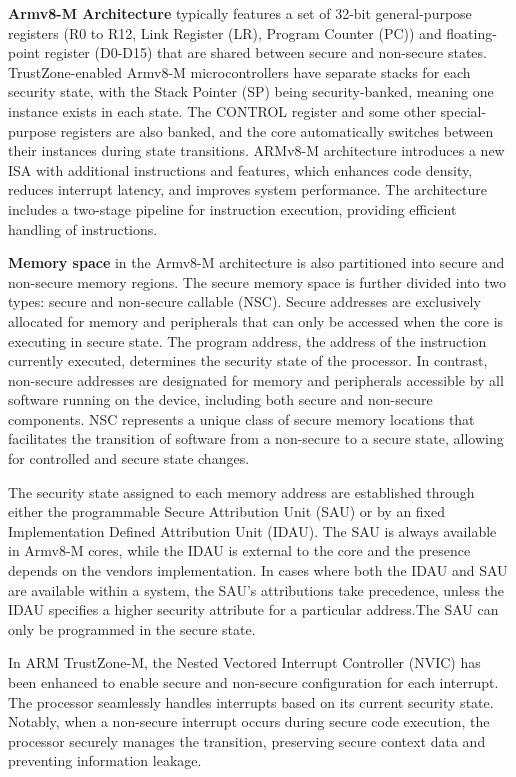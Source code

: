 \textbf{Armv8-M Architecture} typically features a set of 32-bit general-purpose registers (R0 to R12, Link Register (LR), Program Counter (PC)) and floating-point register (D0-D15) that are shared between secure and non-secure states. TrustZone-enabled Armv8-M microcontrollers have separate stacks for each security state, with the Stack Pointer (SP) being security-banked, meaning one instance exists in each state. The CONTROL register and some other special-purpose registers are also banked, and the core automatically switches between their instances during state transitions. ARMv8-M architecture introduces a new ISA with additional instructions and features, which enhances code density, reduces interrupt latency, and improves system performance. The architecture includes a two-stage pipeline for instruction execution, providing efficient handling of instructions.

\textbf{Memory space} in the Armv8-M architecture is also partitioned into secure and non-secure memory regions. The secure memory space is further divided into two types: secure and non-secure callable (\gls{NSC}). Secure addresses are exclusively allocated for memory and peripherals that can only be accessed when the core is executing in secure state. The program address, the address of the instruction currently executed, determines the security state of the processor. In contrast, non-secure addresses are designated for memory and peripherals accessible by all software running on the device, including both secure and non-secure components. \gls{NSC} represents a unique class of secure memory locations that facilitates the transition of software from a non-secure to a secure state, allowing for controlled and secure state changes. 

The security state assigned to each memory address are established through either the programmable Secure Attribution Unit (\gls{SAU}) or by an fixed Implementation Defined Attribution Unit (\gls{IDAU}). The \gls{SAU} is always available in Armv8-M cores, while the \gls{IDAU} is external to the core and the presence depends on the vendors implementation. In cases where both the \gls{IDAU} and \gls{SAU} are available within a system, the \gls{SAU}'s attributions take precedence, unless the \gls{IDAU} specifies a higher security attribute for a particular address.The \gls{SAU} can only be programmed in the secure state. 

In ARM TrustZone-M, the Nested Vectored Interrupt Controller (NVIC) has been enhanced to enable secure and non-secure configuration for each interrupt. The processor seamlessly handles interrupts based on its current security state. Notably, when a non-secure interrupt occurs during secure code execution, the processor securely manages the transition, preserving secure context data and preventing information leakage.

